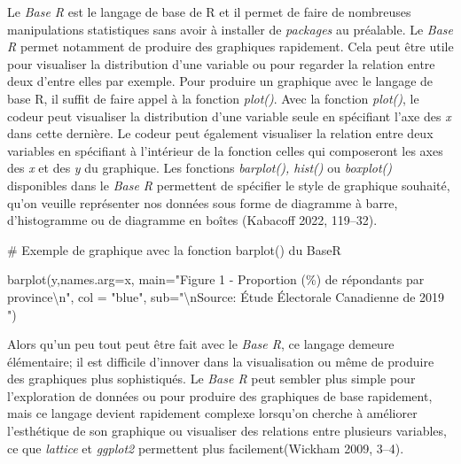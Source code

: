 \documentclass[
  letterpaper,
  DIV=11,
  numbers=noendperiod]{scrreprt}
\newenvironment{Shaded}{\begin{snugshade}}{\end{snugshade}}
\newcommand{\AttributeTok}[1]{\textcolor[rgb]{0.40,0.45,0.13}{#1}}
\newcommand{\CommentTok}[1]{\textcolor[rgb]{0.37,0.37,0.37}{#1}}
\newcommand{\FunctionTok}[1]{\textcolor[rgb]{0.28,0.35,0.67}{#1}}
\newcommand{\NormalTok}[1]{\textcolor[rgb]{0.00,0.23,0.31}{#1}}
\newcommand{\SpecialCharTok}[1]{\textcolor[rgb]{0.37,0.37,0.37}{#1}}
\newcommand{\StringTok}[1]{\textcolor[rgb]{0.13,0.47,0.30}{#1}}
\begin{document}
Le \emph{Base R} est le langage de base de R et il permet de faire de
nombreuses manipulations statistiques sans avoir à installer de
\emph{packages} au préalable. Le \emph{Base R} permet notamment de
produire des graphiques rapidement. Cela peut être utile pour visualiser
la distribution d'une variable ou pour regarder la relation entre deux
d'entre elles par exemple. Pour produire un graphique avec le langage de
base R, il suffit de faire appel à la fonction \emph{plot()}. Avec la
fonction \emph{plot()}, le codeur peut visualiser la distribution d'une
variable seule en spécifiant l'axe des \emph{x} dans cette dernière. Le
codeur peut également visualiser la relation entre deux variables en
spécifiant à l'intérieur de la fonction celles qui composeront les axes
des \emph{x} et des \emph{y} du graphique. Les fonctions
\emph{barplot(), hist()} ou \emph{boxplot()} disponibles dans le
\emph{Base R} permettent de spécifier le style de graphique souhaité,
qu'on veuille représenter nos données sous forme de diagramme à barre,
d'histogramme ou de diagramme en boîtes (Kabacoff 2022, 119--32).

\begin{Shaded}
\begin{Highlighting}[]
\CommentTok{\# Exemple de graphique avec la fonction barplot() du BaseR}

\FunctionTok{barplot}\NormalTok{(y,}\AttributeTok{names.arg=}\NormalTok{x,}
 \AttributeTok{main=}\StringTok{"Figure 1 {-} Proportion (\%) de répondants par province}\SpecialCharTok{\textbackslash{}n}\StringTok{"}\NormalTok{,}
 \AttributeTok{col =} \StringTok{"blue"}\NormalTok{,}
 \AttributeTok{sub=}\StringTok{"}\SpecialCharTok{\textbackslash{}n}\StringTok{Source: Étude Électorale Canadienne de 2019                                                "}\NormalTok{) }
\end{Highlighting}
\end{Shaded}

Alors qu'un peu tout peut être fait avec le \emph{Base R}, ce langage
demeure élémentaire; il est difficile d'innover dans la visualisation ou
même de produire des graphiques plus sophistiqués. Le \emph{Base R} peut
sembler plus simple pour l'exploration de données ou pour produire des
graphiques de base rapidement, mais ce langage devient rapidement
complexe lorsqu'on cherche à améliorer l'esthétique de son graphique ou
visualiser des relations entre plusieurs variables, ce que
\emph{lattice} et \emph{ggplot2} permettent plus facilement(Wickham
2009, 3--4).
\end{document}
